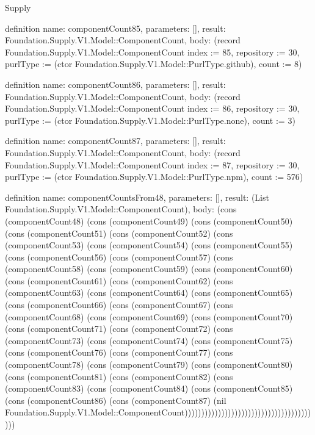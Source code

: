 \begin{lexlean}{Supply}
\begin{semanticmodule}
definition{
  name: componentCount85,
  parameters: [],
  result: Foundation.Supply.V1.Model::ComponentCount,
  body: (record Foundation.Supply.V1.Model::ComponentCount {index := 85, repository := 30, purlType := (ctor Foundation.Supply.V1.Model::PurlType.github), count := 8})
}

definition{
  name: componentCount86,
  parameters: [],
  result: Foundation.Supply.V1.Model::ComponentCount,
  body: (record Foundation.Supply.V1.Model::ComponentCount {index := 86, repository := 30, purlType := (ctor Foundation.Supply.V1.Model::PurlType.none), count := 3})
}

definition{
  name: componentCount87,
  parameters: [],
  result: Foundation.Supply.V1.Model::ComponentCount,
  body: (record Foundation.Supply.V1.Model::ComponentCount {index := 87, repository := 30, purlType := (ctor Foundation.Supply.V1.Model::PurlType.npm), count := 576})
}

definition{
  name: componentCountsFrom48,
  parameters: [],
  result: (List Foundation.Supply.V1.Model::ComponentCount),
  body: (cons (componentCount48) (cons (componentCount49) (cons (componentCount50) (cons (componentCount51) (cons (componentCount52) (cons (componentCount53) (cons (componentCount54) (cons (componentCount55) (cons (componentCount56) (cons (componentCount57) (cons (componentCount58) (cons (componentCount59) (cons (componentCount60) (cons (componentCount61) (cons (componentCount62) (cons (componentCount63) (cons (componentCount64) (cons (componentCount65) (cons (componentCount66) (cons (componentCount67) (cons (componentCount68) (cons (componentCount69) (cons (componentCount70) (cons (componentCount71) (cons (componentCount72) (cons (componentCount73) (cons (componentCount74) (cons (componentCount75) (cons (componentCount76) (cons (componentCount77) (cons (componentCount78) (cons (componentCount79) (cons (componentCount80) (cons (componentCount81) (cons (componentCount82) (cons (componentCount83) (cons (componentCount84) (cons (componentCount85) (cons (componentCount86) (cons (componentCount87) (nil Foundation.Supply.V1.Model::ComponentCount)))))))))))))))))))))))))))))))))))))))))
}


\end{semanticmodule}
\end{lexlean}
